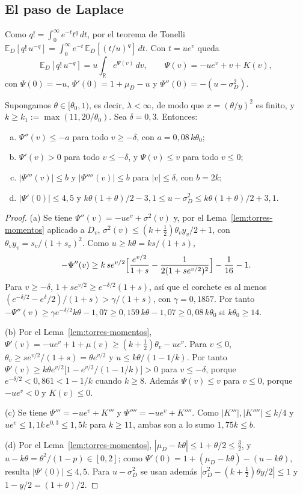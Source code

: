 \subsection{El paso de Laplace}

Como $q!=\int_0^\infty e^{-t}t^q\,dt$, por el teorema de Tonelli
$\mathbb E_D[q!\,u^{-q}]=\int_0^\infty e^{-t}\,\mathbb E_D[(t/u)^q]\,dt$. Con $t=ue^v$ queda
\begin{equation}\label{eq:torres-laplace}
 \mathbb E_D[q!\,u^{-q}]=u\int_{\mathbb R}e^{\Psi(v)}\,dv,\qquad \Psi(v)=-ue^v+v+K(v),
\end{equation}
con $\Psi(0)=-u$, $\Psi'(0)=1+\mu_D-u$ y $\Psi''(0)=-(u-\sigma_D^2)$.

\begin{lema}\label{lem:torres-psi}
Supongamos $\theta\in[\theta_0,1)$, es decir, $\lambda<\infty$, de modo que $x=(\theta/y)^2$ es finito, y
$k\ge k_1:=\max(11,20/\theta_0)$. Sea $\delta=0{,}3$. Entonces:
\begin{enumerate}[(a)]
\item $\Psi''(v)\le-a$ para todo $v\ge-\delta$, con $a=0{,}08\,k\theta_0$;
\item $\Psi'(v)>0$ para todo $v\le-\delta$, y $\Psi(v)\le v$ para todo $v\le0$;
\item $|\Psi'''(v)|\le b$ y $|\Psi''''(v)|\le b$ para $|v|\le\delta$, con $b=2k$;
\item $|\Psi'(0)|\le4{,}5$ y $k\theta(1+\theta)/2-3{,}1\le u-\sigma_D^2\le k\theta(1+\theta)/2+3{,}1$.
\end{enumerate}
\end{lema}
\begin{proof}
(a) Se tiene $\Psi''(v)=-ue^v+\sigma^2(v)$ y, por el Lema~\ref{lem:torres-momentos} aplicado a $D_v$,
$\sigma^2(v)\le(k+\frac12)\theta_vy_v/2+1$, con $\theta_vy_v=s_v/(1+s_v)^2$. Como $u\ge k\theta=ks/(1+s)$,
\[
 -\Psi''(v)\ge k\,se^{v/2}\Bigl[\frac{e^{v/2}}{1+s}-\frac1{2(1+se^{v/2})^2}\Bigr]-\frac1{16}-1.
\]
Para $v\ge-\delta$, $1+se^{v/2}\ge e^{-\delta/2}(1+s)$, así que el corchete es al menos
$(e^{-\delta/2}-e^\delta/2)/(1+s)>\gamma/(1+s)$, con $\gamma=0{,}1857$. Por tanto
$-\Psi''(v)\ge\gamma e^{-\delta/2}k\theta-1{,}07\ge0{,}159\,k\theta-1{,}07\ge0{,}08\,k\theta_0$ si
$k\theta_0\ge14$.

(b) Por el Lema~\ref{lem:torres-momentos}, $\Psi'(v)=-ue^v+1+\mu(v)\ge(k+\frac12)\theta_v-ue^v$. Para
$v\le0$, $\theta_v\ge se^{v/2}/(1+s)=\theta e^{v/2}$ y $u\le k\theta/(1-1/k)$. Por tanto
$\Psi'(v)\ge k\theta e^{v/2}\bigl[1-e^{v/2}/(1-1/k)\bigr]>0$ para $v\le-\delta$, porque
$e^{-\delta/2}<0{,}861<1-1/k$ cuando $k\ge8$. Además $\Psi(v)\le v$ para $v\le0$, porque $-ue^v<0$ y
$K(v)\le0$.

(c) Se tiene $\Psi'''=-ue^v+K'''$ y $\Psi''''=-ue^v+K''''$. Como $|K'''|,|K''''|\le k/4$ y
$ue^v\le1{,}1k\,e^{0{,}3}\le1{,}5k$ para $k\ge11$, ambas son a lo sumo $1{,}75k\le b$.

(d) Por el Lema~\ref{lem:torres-momentos}, $|\mu_D-k\theta|\le1+\theta/2\le\frac32$, y
$u-k\theta=\theta^2/(1-p)\in[0,2]$; como $\Psi'(0)=1+(\mu_D-k\theta)-(u-k\theta)$, resulta
$|\Psi'(0)|\le4{,}5$. Para $u-\sigma_D^2$ se usan además $|\sigma_D^2-(k+\frac12)\theta y/2|\le1$ y
$1-y/2=(1+\theta)/2$.
\end{proof}

